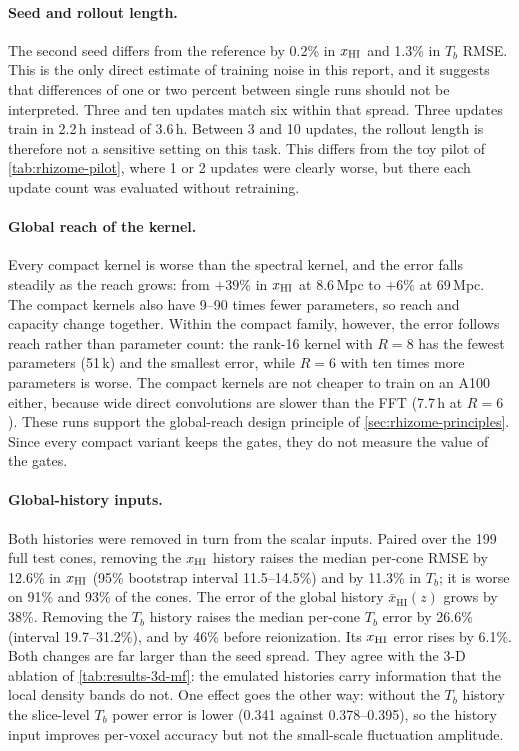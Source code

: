 \paragraph{Seed and rollout length.} The second seed differs from the reference by 0.2\% in $x_{\mathrm{HI}}$ and 1.3\% in $T_b$ RMSE. This is the only direct estimate of training noise in this report, and it suggests that differences of one or two percent between single runs should not be interpreted. Three and ten updates match six within that spread. Three updates train in 2.2\,h instead of 3.6\,h. Between 3 and 10 updates, the rollout length is therefore not a sensitive setting on this task. This differs from the toy pilot of \cref{tab:rhizome-pilot}, where 1 or 2 updates were clearly worse, but there each update count was evaluated without retraining.

\paragraph{Global reach of the kernel.} Every compact kernel is worse than the spectral kernel, and the error falls steadily as the reach grows: from $+39\%$ in $x_{\mathrm{HI}}$ at 8.6\,Mpc to $+6\%$ at 69\,Mpc. The compact kernels also have 9--90 times fewer parameters, so reach and capacity change together. Within the compact family, however, the error follows reach rather than parameter count: the rank-16 kernel with $R=8$ has the fewest parameters (51\,k) and the smallest error, while $R=6$ with ten times more parameters is worse. The compact kernels are not cheaper to train on an A100 either, because wide direct convolutions are slower than the FFT (7.7\,h at $R=6$). These runs support the global-reach design principle of \cref{sec:rhizome-principles}. Since every compact variant keeps the gates, they do not measure the value of the gates.

\paragraph{Global-history inputs.} Both histories were removed in turn from the scalar inputs. Paired over the 199 full test cones, removing the $x_{\mathrm{HI}}$ history raises the median per-cone RMSE by 12.6\% in $x_{\mathrm{HI}}$ (95\% bootstrap interval 11.5--14.5\%) and by 11.3\% in $T_b$; it is worse on 91\% and 93\% of the cones. The error of the global history $\bar x_{\mathrm{HI}}(z)$ grows by 38\%. Removing the $T_b$ history raises the median per-cone $T_b$ error by 26.6\% (interval 19.7--31.2\%), and by 46\% before reionization. Its $x_{\mathrm{HI}}$ error rises by 6.1\%. Both changes are far larger than the seed spread. They agree with the 3-D ablation of \cref{tab:results-3d-mf}: the emulated histories carry information that the local density bands do not. One effect goes the other way: without the $T_b$ history the slice-level $T_b$ power error is lower (0.341 against 0.378--0.395), so the history input improves per-voxel accuracy but not the small-scale fluctuation amplitude.


